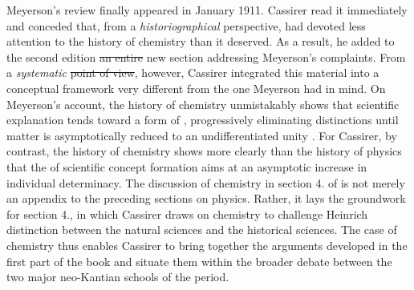 \documentclass[submitted,12pt]{article}
\providecommand{\DIFadd}[1]{{\protect\color{blue}\uwave{#1}}} %
\providecommand{\DIFdel}[1]{{\protect\color{red}\sout{#1}}}                      %
\providecommand{\DIFaddbegin}{} %
\providecommand{\DIFaddend}{} %
\providecommand{\DIFdelbegin}{} %
\providecommand{\DIFdelend}{} %
\begin{document}

Meyerson’s review finally appeared in January 1911. Cassirer read it immediately and conceded that, from a \emph{historiographical} perspective, \EPt had devoted less attention to the history of chemistry than it deserved. As a result, he added to the second edition \DIFdelbegin \DIFdel{an entire }\DIFdelend \DIFaddbegin \DIFadd{a }\DIFaddend new section addressing Meyerson's complaints. From a \emph{systematic} \DIFdelbegin \DIFdel{point of view}\DIFdelend \DIFaddbegin \DIFadd{perspective}\DIFaddend , however, Cassirer integrated this material into a conceptual framework very different from the one Meyerson had in mind. On Meyerson’s account, the history of chemistry unmistakably shows that scientific explanation tends toward a form of  \citep[129]{Meyerson1911}, progressively eliminating distinctions until matter is asymptotically reduced to an undifferentiated unity \citep[see][ch.~]{Meyerson1908}. For Cassirer, by contrast, the history of chemistry shows more clearly than the history of physics that the  of scientific concept formation aims at an asymptotic increase in individual determinacy. The discussion of chemistry in section 4. of \SFt is not merely an appendix to the preceding sections on physics. Rather, it lays the groundwork for section 4., in which Cassirer draws on chemistry to challenge Heinrich  distinction between the  natural sciences and the  historical sciences. The case of chemistry thus enables Cassirer to bring together the arguments developed in the first part of the book and situate them within the broader debate between the two major neo-Kantian schools of the period.
\end{document}
